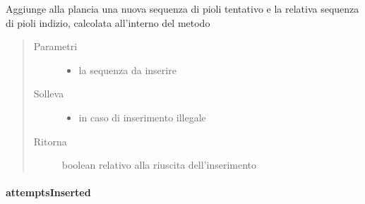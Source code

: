 \documentclass[letterpaper,10pt,italian,openany,oneside]{sphinxmanual}
\begin{document}
\begin{fulllineitems}
\label{\detokenize{test/it/unicam/cs/pa/mastermind/gamecore/BoardModel:it.unicam.cs.pa.mastermind.gamecore.BoardModel.addAttempt(List)}}
Aggiunge alla plancia una nuova sequenza di pioli tentativo e la relativa sequenza di pioli indizio, calcolata all’interno del metodo
\begin{quote}\begin{description}
\item[{Parametri}] \leavevmode\begin{itemize}
\item {} 
 \textendash{} la sequenza da inserire

\end{itemize}

\item[{Solleva}] \leavevmode\begin{itemize}
\item {} 
 \textendash{} in caso di inserimento illegale

\end{itemize}

\item[{Ritorna}] \leavevmode
boolean relativo alla riuscita dell’inserimento

\end{description}\end{quote}

\end{fulllineitems}



\paragraph{attemptsInserted}
\label{\detokenize{test/it/unicam/cs/pa/mastermind/gamecore/BoardModel:attemptsinserted}}
\end{document}
